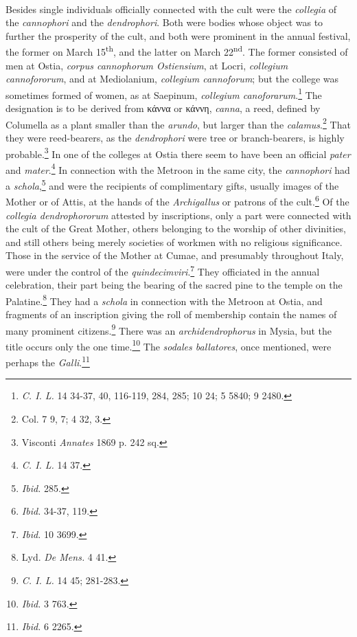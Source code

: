 \documentclass[a4paper, 11pt, oneside, polutonikogreek, english]{article}
\begin{document}
\paragraph{}
Besides single individuals officially connected with the cult were the \emph{collegia} of the \emph{cannophori} and the \emph{dendrophori}. Both were bodies whose object was to further the prosperity of the cult, and both were prominent in the annual festival, the former on March 15\textsuperscript{th}, and the latter on March 22\textsuperscript{nd}. The former consisted of men at Ostia, \emph{corpus cannophorum Ostiensium}, at Locri, \emph{collegium cannofororum}, and at Mediolanium, \emph{collegium cannoforum}; but the college was sometimes formed of women, as at Saepinum, \emph{collegium canoforarum}.\footnote{\emph{C. I. L.} 14 34-37, 40, 116-119, 284, 285; 10 24; 5 5840; 9 2480.} The designation is to be derived from κάννα or κάννη, \emph{canna}, a reed, defined by Columella as a plant smaller than the \emph{arundo}, but larger than the \emph{calamus}.\footnote{Col. 7 9, 7; 4 32, 3.} That they were reed-bearers, as the \emph{dendrophori} were tree or branch-bearers, is highly probable.\footnote{Visconti \emph{Annates} 1869 p. 242 sq.} In one of the colleges at Ostia there seem to have been an official \emph{pater} and \emph{mater}.\footnote{\emph{C. I. L.} 14 37.} In connection with the Metroon in the same city, the \emph{cannophori} had a \emph{schola},\footnote{\emph{Ibid.} 285.} and were the recipients of complimentary gifts, usually images of the Mother or of Attis, at the hands of the \emph{Archigallus} or patrons of the cult.\footnote{\emph{Ibid.} 34-37, 119.} Of the \emph{collegia dendrophororum} attested by inscriptions, only a part were connected with the cult of the Great Mother, others belonging to the worship of other divinities, and still others being merely societies of workmen with no religious significance. Those in the service of the Mother at Cumae, and presumably throughout Italy, were under the control of the \emph{quindecimviri}.\footnote{\emph{Ibid.} 10 3699.} They officiated in the annual celebration, their part being the bearing of the sacred pine to the temple on the Palatine.\footnote{Lyd. \emph{De Mens.} 4 41.} They had a \emph{schola} in connection with the Metroon at Ostia, and fragments of an inscription giving the roll of membership contain the names of many prominent citizens.\footnote{\emph{C. I. L.} 14 45; 281-283.} There was an \emph{archidendrophorus} in Mysia, but the title occurs only the one time.\footnote{\emph{Ibid.} 3 763.} The \emph{sodales ballatores}, once mentioned, were perhaps the \emph{Galli}.\footnote{\emph{Ibid.} 6 2265.}
\end{document}

